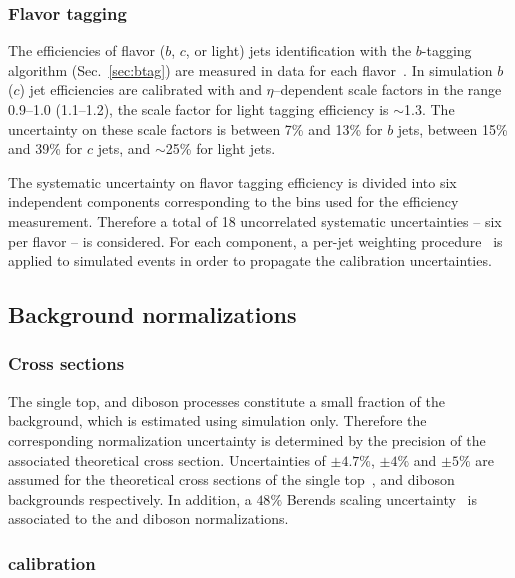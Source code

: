 \subsubsection{Flavor tagging}
\label{sec:syst_btag}

The efficiencies of flavor ($b$, $c$, or light) jets identification with
the $b$-tagging algorithm (Sec.~\ref{sec:btag}) are measured in data
for each flavor~\cite{btagging,ctagging,ltagging}.
In simulation $b$ ($c$) jet efficiencies are calibrated with
\pt{} and $\eta$--dependent scale factors in the range 0.9--1.0 (1.1--1.2), the
scale factor for light tagging efficiency is $\sim$1.3.
The uncertainty on these scale factors is  between 7\% and 13\% for
$b$ jets, between 15\% and 39\% for $c$ jets, and $\sim$25\% for light jets.

The systematic uncertainty on flavor tagging efficiency is divided
into six independent components corresponding to the \pt bins used for
the efficiency measurement. Therefore a total of 18 uncorrelated
systematic uncertainties -- six per flavor -- is considered.
For each component, a per-jet weighting procedure~\cite{IFAEBtagNote}
is applied to simulated events in order to propagate the calibration
uncertainties.

\subsection{Background normalizations}

\subsubsection{Cross sections}
\label{sec:syst_bkgxsect}

 The single top, \zjets{} and diboson processes constitute a small
fraction of the background, which is estimated using simulation only.
Therefore the corresponding normalization uncertainty is determined by
the precision of the associated theoretical cross section.
Uncertainties of $\pm4.7\%$, $\pm4\%$ and $\pm 5\%$ are assumed
for the theoretical cross sections of the single
top~\cite{stopxs,stopxs_2}, \zjets{} and diboson~\cite{dibosonxs} backgrounds
respectively.
In addition, a $48\%$ Berends scaling uncertainty~\cite{berends} is
associated to the \zjets{} and diboson normalizations.

\subsubsection{\wjets{} calibration}
\label{sec:syst_wjets}

